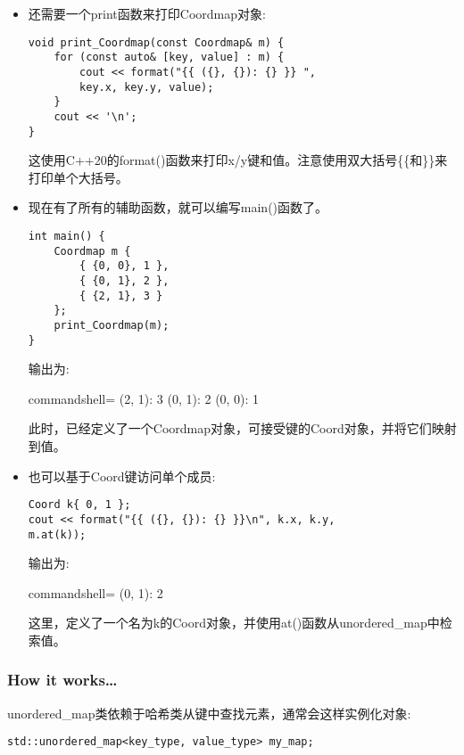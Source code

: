 \begin{itemize}
\item 
还需要一个print函数来打印Coordmap对象:

\begin{lstlisting}[style=styleCXX]
void print_Coordmap(const Coordmap& m) {
	for (const auto& [key, value] : m) {
		cout << format("{{ ({}, {}): {} }} ",
		key.x, key.y, value);
	}
	cout << '\n';
}
\end{lstlisting}

这使用C++20的format()函数来打印x/y键和值。注意使用双大括号\{\{和\}\}来打印单个大括号。

\item 
现在有了所有的辅助函数，就可以编写main()函数了。

\begin{lstlisting}[style=styleCXX]
int main() {
	Coordmap m {
		{ {0, 0}, 1 },
		{ {0, 1}, 2 },
		{ {2, 1}, 3 }
	};
	print_Coordmap(m);
}
\end{lstlisting}

输出为:

\begin{tcblisting}{commandshell={}}
{ (2, 1): 3 } { (0, 1): 2 } { (0, 0): 1 }
\end{tcblisting}

此时，已经定义了一个Coordmap对象，可接受键的Coord对象，并将它们映射到值。

\item 
也可以基于Coord键访问单个成员:

\begin{lstlisting}[style=styleCXX]
Coord k{ 0, 1 };
cout << format("{{ ({}, {}): {} }}\n", k.x, k.y,
m.at(k));
\end{lstlisting}

输出为:

\begin{tcblisting}{commandshell={}}
{ (0, 1): 2 }
\end{tcblisting}

这里，定义了一个名为k的Coord对象，并使用at()函数从unordered\_map中检索值。

\end{itemize}

\subsubsection{How it works…}

unordered\_map类依赖于哈希类从键中查找元素，通常会这样实例化对象:

\begin{lstlisting}[style=styleCXX]
std::unordered_map<key_type, value_type> my_map;
\end{lstlisting}

